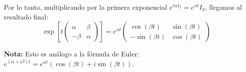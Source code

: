 Por lo tanto, multiplicando por la primera exponencial $e^{t\alpha I_2} = e^{\alpha t} I_2$, llegamos al resultado final:
\[
    \exp \left[ t \begin{pmatrix} \alpha & \beta \\ -\beta & \alpha \end{pmatrix} \right] = e^{\alpha t} \begin{pmatrix} \cos(\beta t) & \sin(\beta t) \\ -\sin(\beta t) & \cos(\beta t) \end{pmatrix}
\]

\textbf{Nota:} Esto es análogo a la fórmula de Euler: $e^{(\alpha + i\beta)t} = e^{\alpha t} (\cos(\beta t) + i \sin(\beta t))$.